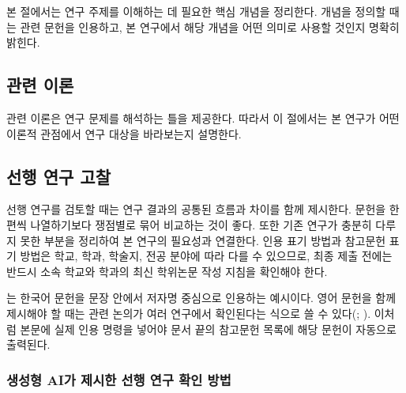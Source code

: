 본 절에서는 연구 주제를 이해하는 데 필요한 핵심 개념을 정리한다.
개념을 정의할 때는 관련 문헌을 인용하고, 본 연구에서 해당 개념을 어떤 의미로 사용할 것인지 명확히 밝힌다.

\subsection{관련 이론}


관련 이론은 연구 문제를 해석하는 틀을 제공한다.
따라서 이 절에서는 본 연구가 어떤 이론적 관점에서 연구 대상을 바라보는지 설명한다.

\subsection{선행 연구 고찰}


선행 연구를 검토할 때는 연구 결과의 공통된 흐름과 차이를 함께 제시한다.
문헌을 한 편씩 나열하기보다 쟁점별로 묶어 비교하는 것이 좋다.
또한 기존 연구가 충분히 다루지 못한 부분을 정리하여 본 연구의 필요성과 연결한다.
인용 표기 방법과 참고문헌 표기 방법은 학교, 학과, 학술지, 전공 분야에 따라 다를 수 있으므로, 최종 제출 전에는 반드시 소속 학교와 학과의 최신 학위논문 작성 지침을 확인해야 한다.

는 한국어 문헌을 문장 안에서 저자명 중심으로 인용하는 예시이다.
영어 문헌을 함께 제시해야 할 때는 관련 논의가 여러 연구에서 확인된다는 식으로 쓸 수 있다(; \parencite{eng_perkel2018jupyter}).
이처럼 본문에 실제 인용 명령을 넣어야 문서 끝의 참고문헌 목록에 해당 문헌이 자동으로 출력된다.

\subsubsection{생성형 AI가 제시한 선행 연구 확인 방법}

